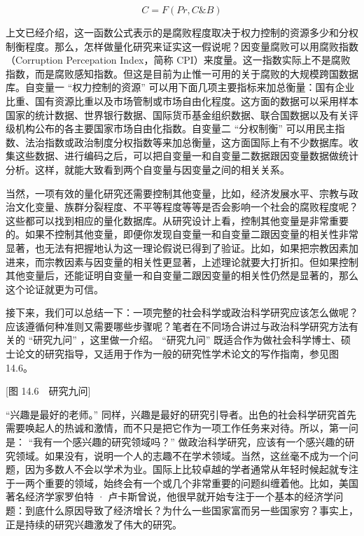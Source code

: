 \[C = F(Pr, C\&B)\]

上文已经介绍，这一函数公式表示的是腐败程度取决于权力控制的资源多少和分权制衡程度。那么，怎样做量化研究来证实这一假说呢？因变量腐败可以用腐败指数（Corruption Percepation Index，简称 CPI）来度量。这一指数实际上不是腐败指数，而是腐败感知指数。但这是目前为止惟一可用的关于腐败的大规模跨国数据库。自变量一 “权力控制的资源” 可以用下面几项主要指标来加总衡量：国有企业比重、国有资源比重以及市场管制或市场自由化程度。这方面的数据可以采用样本国家的统计数据、世界银行数据、国际货币基金组织数据、联合国数据以及有关评级机构公布的各主要国家市场自由化指数。自变量二 “分权制衡” 可以用民主指数、法治指数或政治制度分权指数等来加总衡量，这方面国际上有不少数据库。收集这些数据、进行编码之后，可以把自变量一和自变量二数据跟因变量数据做统计分析。这样，就能大致看到两个自变量与因变量之间的相关关系。

当然，一项有效的量化研究还需要控制其他变量，比如，经济发展水平、宗教与政治文化变量、族群分裂程度、不平等程度等等是否会影响一个社会的腐败程度呢？这些都可以找到相应的量化数据库。从研究设计上看，控制其他变量是非常重要的。如果不控制其他变量，即便你发现自变量一和自变量二跟因变量的相关性非常显著，也无法有把握地认为这一理论假说已得到了验证。比如，如果把宗教因素加进来，而宗教因素与因变量的相关性更显著，上述理论就要大打折扣。但如果控制其他变量后，还能证明自变量一和自变量二跟因变量的相关性仍然是显著的，那么这个论证就更为可信。


接下来，我们可以总结一下：一项完整的社会科学或政治科学研究应该怎么做呢？应该遵循何种准则又需要哪些步骤呢？笔者在不同场合讲过与政治科学研究方法有关的 “研究九问” ，这里做一介绍。 “研究九问” 既适合作为做社会科学博士、硕士论文的研究指导，又适用于作为一般的研究性学术论文的写作指南，参见图 14.6。

[图 14.6　研究九问]

 “兴趣是最好的老师。” 同样，兴趣是最好的研究引导者。出色的社会科学研究首先需要唤起人的热诚和激情，而不只是把它作为一项工作任务来对待。所以，第一问是： “我有一个感兴趣的研究领域吗？” 做政治科学研究，应该有一个感兴趣的研究领域。如果没有，说明一个人的志趣不在学术领域。当然，这丝毫不成为一个问题，因为多数人不会以学术为业。国际上比较卓越的学者通常从年轻时候起就专注于一两个重要的领域，始终会有一个或几个非常重要的问题纠缠着他。比如，美国著名经济学家罗伯特 · 卢卡斯曾说，他很早就开始专注于一个基本的经济学问题：到底什么原因导致了经济增长？为什么一些国家富而另一些国家穷？事实上，正是持续的研究兴趣激发了伟大的研究。

